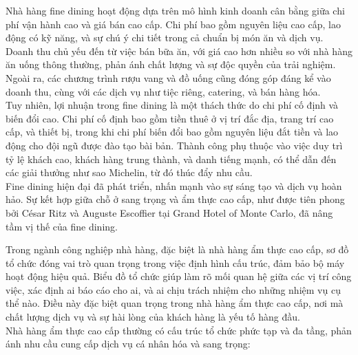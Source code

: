 Nhà hàng fine dining hoạt động dựa trên mô hình kinh doanh cân bằng giữa chi phí vận hành cao và giá bán cao cấp. Chi phí bao gồm nguyên liệu cao cấp, lao động có kỹ năng, và sự chú ý chi tiết trong cả chuẩn bị món ăn và dịch vụ. Doanh thu chủ yếu đến từ việc bán bữa ăn, với giá cao hơn nhiều so với nhà hàng ăn uống thông thường, phản ánh chất lượng và sự độc quyền của trải nghiệm. Ngoài ra, các chương trình rượu vang và đồ uống cũng đóng góp đáng kể vào doanh thu, cùng với các dịch vụ như tiệc riêng, catering, và bán hàng hóa. \\

Tuy nhiên, lợi nhuận trong fine dining là một thách thức do chi phí cố định và biến đổi cao. Chi phí cố định bao gồm tiền thuê ở vị trí đắc địa, trang trí cao cấp, và thiết bị, trong khi chi phí biến đổi bao gồm nguyên liệu đắt tiền và lao động cho đội ngũ được đào tạo bài bản. Thành công phụ thuộc vào việc duy trì tỷ lệ khách cao, khách hàng trung thành, và danh tiếng mạnh, có thể dẫn đến các giải thưởng như sao Michelin, từ đó thúc đẩy nhu cầu. \\

Fine dining hiện đại đã phát triển, nhấn mạnh vào sự sáng tạo và dịch vụ hoàn hảo. Sự kết hợp giữa chỗ ở sang trọng và ẩm thực cao cấp, như được tiên phong bởi César Ritz và Auguste Escoffier tại Grand Hotel of Monte Carlo, đã nâng tầm vị thế của fine dining.


Trong ngành công nghiệp nhà hàng, đặc biệt là nhà hàng ẩm thực cao cấp, sơ đồ tổ chức đóng vai trò quan trọng trong việc định hình cấu trúc, đảm bảo bộ máy hoạt động hiệu quả. Biểu đồ tổ chức giúp làm rõ mối quan hệ giữa các vị trí công việc, xác định ai báo cáo cho ai, và ai chịu trách nhiệm cho những nhiệm vụ cụ thể nào. Điều này đặc biệt quan trọng trong nhà hàng ẩm thực cao cấp, nơi mà chất lượng dịch vụ và sự hài lòng của khách hàng là yếu tố hàng đầu. \\
Nhà hàng ẩm thực cao cấp thường có cấu trúc tổ chức phức tạp và đa tầng, phản ánh nhu cầu cung cấp dịch vụ cá nhân hóa và sang trọng:

